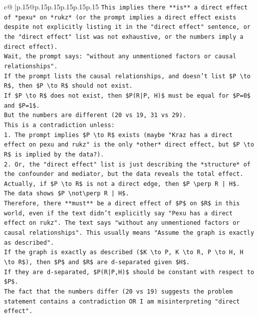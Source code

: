 \documentclass{article}
\begin{document}
{\begin{supertabular}{c@{$\;$}|p{.15\linewidth}@{}p{.15\linewidth}p{.15\linewidth}p{.15\linewidth}p{.15\linewidth}p{.15\linewidth}}
{{{\texttt{This implies there **is** a direct effect of *pexu* on *rukz* (or the prompt implies a direct effect exists despite not explicitly listing it in the "direct effect" sentence, or the "direct effect" list was not exhaustive, or the numbers imply a direct effect).} \\
\texttt{Wait, the prompt says: "without any unmentioned factors or causal relationships".} \\
\texttt{If the prompt lists the causal relationships, and doesn't list \$P \textbackslash{}to R\$, then \$P \textbackslash{}to R\$ should not exist.} \\
\texttt{If \$P \textbackslash{}to R\$ does not exist, then \$P(R|P, H)\$ must be equal for \$P=0\$ and \$P=1\$.} \\
\texttt{But the numbers are different (20 vs 19, 31 vs 29).} \\
\texttt{This is a contradiction unless:} \\
\texttt{1.  The prompt implies \$P \textbackslash{}to R\$ exists (maybe "Kraz has a direct effect on pexu and rukz" is the only *other* direct effect, but \$P \textbackslash{}to R\$ is implied by the data?).} \\
\texttt{2.  Or, the "direct effect" list is just describing the *structure* of the confounder and mediator, but the data reveals the total effect.} \\
\texttt{Actually, if \$P \textbackslash{}to R\$ is not a direct edge, then \$P \textbackslash{}perp R | H\$.} \\
\texttt{The data shows \$P \textbackslash{}not\textbackslash{}perp R | H\$.} \\
\texttt{Therefore, there **must** be a direct effect of \$P\$ on \$R\$ in this world, even if the text didn't explicitly say "Pexu has a direct effect on rukz". The text says "without any unmentioned factors or causal relationships". This usually means "Assume the graph is exactly as described".} \\
\texttt{If the graph is exactly as described (\$K \textbackslash{}to P, K \textbackslash{}to R, P \textbackslash{}to H, H \textbackslash{}to R\$), then \$P\$ and \$R\$ are d{-}separated given \$H\$.} \\
\texttt{If they are d{-}separated, \$P(R|P,H)\$ should be constant with respect to \$P\$.} \\
\texttt{The fact that the numbers differ (20 vs 19) suggests the problem statement contains a contradiction OR I am misinterpreting "direct effect".} \\
}}}
\end{supertabular}}
\end{document}
